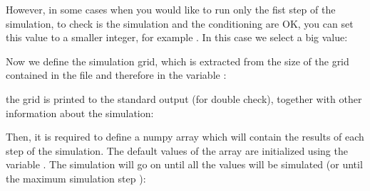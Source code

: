 \documentclass[letterpaper,10pt,english]{sphinxmanual}
\begin{document}
However, in some cases when you would like to run only the fist step
of the simulation, to check is the simulation and the conditioning are
OK, you can set this value to a smaller integer, for example .
In this case we select a big value:

\begin{sphinxVerbatim}[commandchars=\\\{\}]
  
\end{sphinxVerbatim}

Now we define the simulation grid, which is extracted from the size of
the grid contained in the file  and therefore in the
variable :

\begin{sphinxVerbatim}[commandchars=\\\{\}]
  
\end{sphinxVerbatim}

the grid is printed to the standard output (for double check),
together with other information about the simulation:

\begin{sphinxVerbatim}[commandchars=\\\{\}]
   
\end{sphinxVerbatim}

Then, it is required to define a numpy array which will contain the
results of each step of the simulation. The default values of the
array are initialized using the variable . The
simulation will go on until all the  values will be simulated
(or until the maximum simulation step ):

\begin{sphinxVerbatim}[commandchars=\\\{\}]
    
       
\end{sphinxVerbatim}
\end{document}
